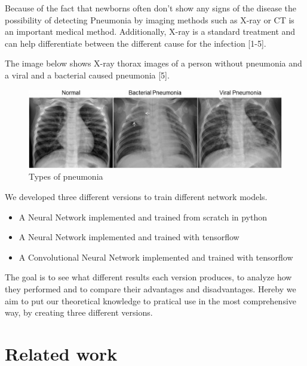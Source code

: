 \documentclass{article}
\begin{document}
Because of the fact that newborns often don't show any signs of the disease the possibility 
of detecting Pneumonia by imaging methods such as X-ray or CT is an important medical method. 
Additionally, X-ray is a standard treatment and can help differentiate between the different 
cause for the infection [1-5].

The image below shows X-ray thorax images of a person without pneumonia and a viral and a bacterial caused pneumonia [5].

\begin{figure}[ht]
  \centering
  \includegraphics[scale=1]{images/typesofpneumonia.jpg}
  \caption{Types of pneumonia}
  \label{fig:types_of_pneumonia}
\end{figure}

We developed three different versions to train different network models.

\begin{itemize}
  \item A Neural Network implemented and trained from scratch in python
  \item A Neural Network implemented and trained with tensorflow
  \item A Convolutional Neural Network implemented and trained with tensorflow
\end{itemize}

The goal is to see what different results each version produces, 
to analyze how they performed and to compare their advantages and disadvantages. 
Hereby we aim to put our theoretical knowledge to pratical use in the most comprehensive way, 
by creating three different versions. 

\section{Related work}
\end{document}
